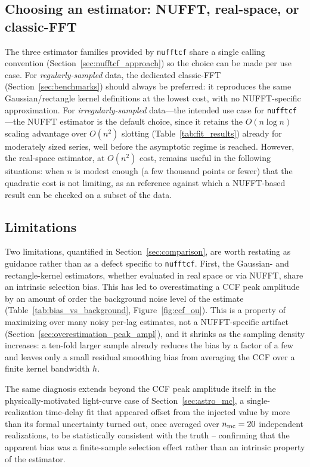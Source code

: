 \documentclass[twocolumn,10pt]{article}
\newcommand{\nufftcf}{\texttt{nufftcf}\xspace}
\begin{document}
\subsection{Choosing an estimator: NUFFT, real-space, or classic-FFT}
\label{sec:discussion_choice}
%
The three estimator families provided by \nufftcf share a single calling convention
(Section~\ref{sec:nufftcf_approach}) so the choice can be
made per use case. For
\emph{regularly-sampled} data, the dedicated classic-FFT 
(Section~\ref{sec:benchmarks}) should always be preferred: it reproduces
the same Gaussian/rectangle kernel definitions at the lowest cost, with
no NUFFT-specific approximation. For \emph{irregularly-sampled} data---the
intended use case for \nufftcf---the NUFFT estimator is the default
choice, since it retains the $O(n\log n)$ scaling advantage over
$O(n^2)$ slotting (Table~\ref{tab:fit_results}) already for
moderately sized series, well before the asymptotic regime is reached.
However, the real-space estimator, at $O(n^2)$ cost, remains useful in the following
situations: when $n$ is modest enough
(a few thousand points or fewer) that the quadratic cost is not
limiting, as an reference against which a NUFFT-based result
can be checked on a subset of the data. 
%
\subsection{Limitations}
\label{sec:discussion_limitations_new}
%
Two limitations, quantified in Section~\ref{sec:comparison}, are worth
restating as guidance rather than as a defect specific to \nufftcf.
First, the Gaussian- and rectangle-kernel estimators, whether
evaluated in real space or via NUFFT, share an intrinsic selection
bias. This has led to overestimating a CCF peak amplitude by an amount of
order the background noise level of the estimate
(Table~\ref{tab:bias_vs_background}, Figure~\ref{fig:ccf_ou}).
This is a property of maximizing over many noisy per-lag estimates, not a
NUFFT-specific artifact (Section~\ref{sec:overestimation_peak_ampl}), and it
shrinks as the sampling density increases: a ten-fold larger sample already
reduces the bias by a factor of a few and leaves only a small residual
smoothing bias from averaging the CCF over a finite kernel bandwidth $h$.

The same diagnosis extends beyond the CCF peak amplitude itself: in the
physically-motivated light-curve case of Section~\ref{sec:astro_mc}, a
single-realization time-delay fit that appeared offset from the injected
value by more than its formal uncertainty turned out, once averaged over
$n_{\rm mc}=20$ independent realizations, to be statistically consistent
with the truth -- confirming that the apparent bias was a finite-sample
selection effect rather than an intrinsic property of the estimator. 
\end{document}
